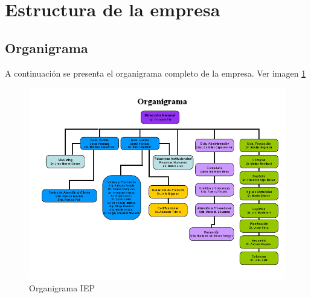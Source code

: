 \section{Estructura de la empresa}

\subsection{Organigrama}
A continuación se presenta el organigrama completo de la empresa. Ver imagen \ref{organigramaIEP}

\begin{figure}[h!]
  \centering
  \includegraphics[scale=0.55]{./Images/organigrama.png}
  \caption{Organigrama IEP}\label{organigramaIEP}
\end{figure}